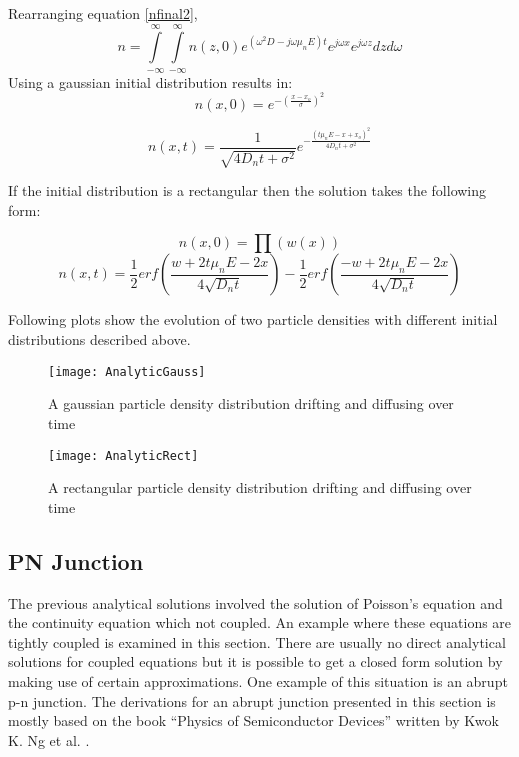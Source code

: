 \begin{doublespace}
Rearranging equation \eqref{nfinal2},
\begin{equation}
n=\int\limits_{-\infty}^{\infty}\int\limits_{-\infty}^{\infty}n(z,0) e^{(\omega ^2 D-j\omega \mu_n E)t}e^{j\omega x} e^{j\omega z}  dz d\omega
\end{equation}
Using a gaussian initial distribution results in:
\begin{equation}
n(x,0)=e^{- (\frac{x-x_o}{\sigma})^2}
\end{equation}

\begin{equation}
n(x,t)=\frac{1}{\sqrt{4D_nt+\sigma^{2}}}e^{-\frac{(t\mu_n E-x+x_o)^2}{4D_n t+\sigma^2}}
\end{equation}

If the initial distribution is a rectangular then the solution takes the following form:

\begin{equation}
n(x,0)=\prod (w(x))
\end{equation}
\begin{equation}
n(x,t)=\frac{1}{2} erf(\frac{w+2t \mu_n E-2x}{4\sqrt{D_n t}})-\frac{1}{2}erf(\frac{-w+2t \mu_n E-2x}{4\sqrt{D_n t}}) 
\end{equation}

Following plots show the evolution of two particle densities with  different initial distributions described above.

\begin{figure}[!htp]
\centering
\texttt{[image: AnalyticGauss]}
\caption{A gaussian particle density distribution drifting and diffusing over time} 
\end{figure}

\begin{figure}[!htp]
\centering
\texttt{[image: AnalyticRect]}
\caption{A rectangular particle density distribution drifting and diffusing over time} 
\end{figure}
\clearpage
\subsection{PN Junction}
The previous analytical solutions involved the solution of Poisson's equation and the continuity equation which  not coupled. An example where these equations are tightly coupled is examined in this section. There are usually no direct analytical solutions for coupled equations but it is possible to get a closed form solution by making use of certain approximations. One example of this situation is an abrupt p-n junction. The derivations for an abrupt junction presented in this section is mostly based on the book ``Physics of Semiconductor Devices'' written by Kwok K. Ng et al. \cite{Physem}. 


\end{doublespace}
